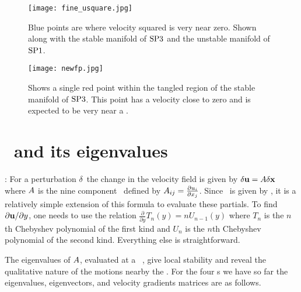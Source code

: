 \begin{center}
\begin{figure}[!h]
\texttt{[image: fine\_usquare.jpg]}
  \caption{
   Blue points are where velocity squared is very near zero.
   Shown along with the stable manifold
   of ${{\text{SP3}}}$ and the unstable manifold of ${{\text{SP1}}}$.
          }
  \label{eltonFig:fine_usquare}
 \end{figure}
\end{center}

\begin{center}
\begin{figure}[!h]
\texttt{[image: newfp.jpg]}
  \caption{
   Shows a single red point within the tangled region of the stable manifold of ${{\text{SP3}}}$.
   This point has a velocity close to zero and is expected to be very near a \stagp.
          }
  \label{eltonFig:newfp}
 \end{figure}
\end{center}



\section{\Velgradmat\ and its eigenvalues}
\label{sec:velgradmat}

: For a perturbation $\delta$\bx\
the change in the velocity field is given by $\delta{\bf u} = A
\delta{\bf x}$ where $A$ is the nine component \velgradmat\ defined
by $A_{ij}=\frac{\partial u_{i}}{\partial x_{j}}$. Since \bu\ is
given by \refeq{eqn:spectralsum}, it is a relatively simple
extension of this formula to evaluate these partials. To find
$\partial{\bf u}/\partial y$, one needs to use the relation
$\frac{\partial}{\partial y}T_{n}(y) = n U_{n-1}(y)$ where $T_{n}$
is the $n$th Chebyshev polynomial of the first kind and $U_{n}$ is
the $n$th Chebyshev polynomial of the second kind. Everything else
is straightforward.


The eigenvalues of $A$, evaluated at a \stagp\ , give local stability
and reveal the qualitative nature of the motions nearby the \stagp.
For the four \stagp s we have so far the eigenvalues, eigenvectors,
and velocity gradients matrices are as follows. \\

